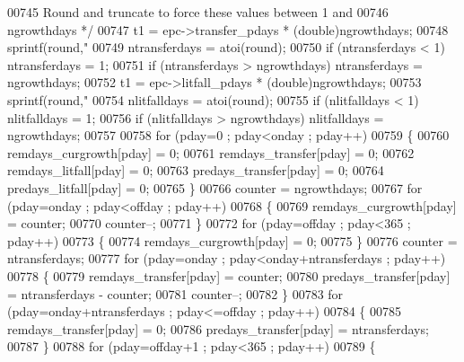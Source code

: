 \begin{DoxyCode}
{{{{{00745 \textcolor{comment}{                Round and truncate to force these values between 1 and }
00746 \textcolor{comment}{                ngrowthdays */}
00747                 t1 = epc->transfer\_pdays * (double)ngrowthdays;
00748                 sprintf(round,\textcolor{stringliteral}{"%
00749                 ntransferdays = atoi(round);
00750                 \textcolor{keywordflow}{if} (ntransferdays < 1) ntransferdays = 1;
00751                 \textcolor{keywordflow}{if} (ntransferdays > ngrowthdays) ntransferdays = ngrowthdays;
00752                 t1 = epc->litfall\_pdays * (double)ngrowthdays;
00753                 sprintf(round,\textcolor{stringliteral}{"%
00754                 nlitfalldays = atoi(round);
00755                 \textcolor{keywordflow}{if} (nlitfalldays < 1) nlitfalldays = 1;
00756                 \textcolor{keywordflow}{if} (nlitfalldays > ngrowthdays) nlitfalldays = ngrowthdays;
00757                 
00758                 \textcolor{keywordflow}{for} (pday=0 ; pday<onday ; pday++)
00759                 \{
00760                     remdays\_curgrowth[pday] = 0;
00761                     remdays\_transfer[pday] = 0;
00762                     remdays\_litfall[pday] = 0;
00763                     predays\_transfer[pday] = 0;
00764                     predays\_litfall[pday] = 0;
00765                 \}
00766                 counter = ngrowthdays;
00767                 \textcolor{keywordflow}{for} (pday=onday ; pday<offday ; pday++)
00768                 \{
00769                     remdays\_curgrowth[pday] = counter;
00770                     counter--;
00771                 \}
00772                 \textcolor{keywordflow}{for} (pday=offday ; pday<365 ; pday++)
00773                 \{
00774                     remdays\_curgrowth[pday] = 0;
00775                 \}
00776                 counter = ntransferdays;
00777                 \textcolor{keywordflow}{for} (pday=onday ; pday<onday+ntransferdays ; pday++)
00778                 \{
00779                     remdays\_transfer[pday] = counter;
00780                     predays\_transfer[pday] = ntransferdays - counter;
00781                     counter--;
00782                 \}
00783                 \textcolor{keywordflow}{for} (pday=onday+ntransferdays ; pday<=offday ; pday++)
00784                 \{
00785                     remdays\_transfer[pday] = 0;
00786                     predays\_transfer[pday] = ntransferdays;
00787                 \}
00788                 \textcolor{keywordflow}{for} (pday=offday+1 ; pday<365 ; pday++)
00789                 \{
}}}}}}}
\end{DoxyCode}
